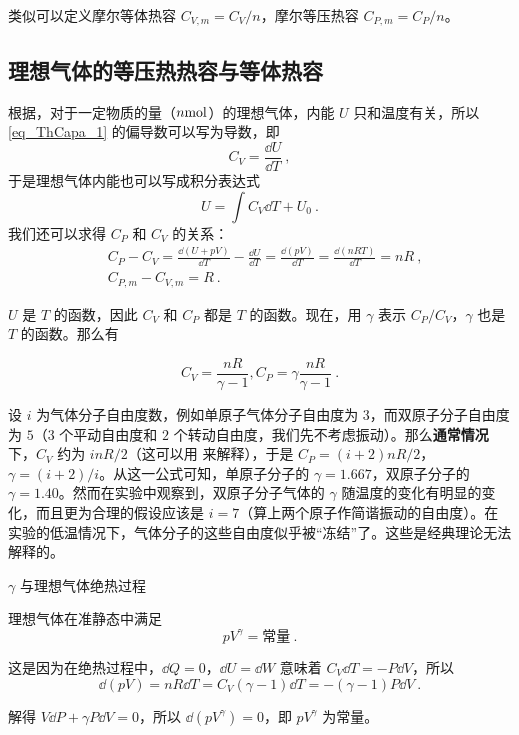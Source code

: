 类似可以定义摩尔等体热容 $C_{V,m}=C_V/n$，摩尔等压热容 $C_{P,m}=C_P/n$。

\subsection{理想气体的等压热热容与等体热容}

根据，对于一定物质的量（$n \rm{mol}$）的理想气体，内能 $U$ 只和温度有关，所以 \autoref{eq_ThCapa_1} 的偏导数可以写为导数，即
\begin{equation}
C_V=\frac{\dd U}{\dd T}~,
\end{equation}
于是理想气体内能也可以写成积分表达式
\begin{equation}
U=\int C_V\dd T + U_0~.
\end{equation}
我们还可以求得 $C_P$ 和 $C_V$ 的关系：
\begin{equation}
\begin{aligned}
&C_P-C_V=\frac{\dd (U+pV)}{\dd T}-\frac{\dd U}{\dd T}=\frac{\dd(pV)}{\dd T}=\frac{\dd (nRT)}{\dd T}=nR~,\\
&C_{P,m}-C_{V,m}=R~.
\end{aligned}
\end{equation}

$U$ 是 $T$ 的函数，因此 $C_V$ 和 $C_P$ 都是 $T$ 的函数。现在，用 $\gamma$ 表示 $C_P/C_V$，$\gamma$ 也是 $T$ 的函数。那么有

\begin{equation}\label{eq_ThCapa_4}
C_V=\frac{nR}{\gamma-1},C_P=\gamma\frac{nR}{\gamma-1}~.
\end{equation}

设 $i$ 为气体分子自由度数，例如单原子气体分子自由度为 $3$，而双原子分子自由度为 $5$（$3$ 个平动自由度和 $2$ 个转动自由度，我们先不考虑振动）。那么\textbf{通常情况}下，$C_V$ 约为 $inR/2$（这可以用 来解释），于是 $C_P=(i+2)nR/2$，$\gamma=(i+2)/i$。从这一公式可知，单原子分子的 $\gamma=1.667$，双原子分子的 $\gamma=1.40$。然而在实验中观察到，双原子分子气体的 $\gamma$ 随温度的变化有明显的变化，而且更为合理的假设应该是 $i=7$（算上两个原子作简谐振动的自由度）。在实验的低温情况下，气体分子的这些自由度似乎被“冻结”了。这些是经典理论无法解释的。
\begin{example}{$\gamma$ 与理想气体绝热过程}

理想气体在准静态中满足
\begin{equation}
pV^{\gamma}=\text{常量}~.
\end{equation}

这是因为在绝热过程中，$\dd{Q}=0$，$\dd{U}=\dd{W}$ 意味着 $C_V\dd{T}=-P\dd{V}$，所以
\begin{equation}
\dd(pV)=nR\dd{T}=C_V(\gamma-1)\dd{T}=-(\gamma-1)P\dd{V}~.
\end{equation}

解得 $V\dd{P}+\gamma P\dd{V} = 0$，所以 $\dd{(pV^\gamma)}=0$，即 $pV^{\gamma}$ 为常量。
\end{example}

